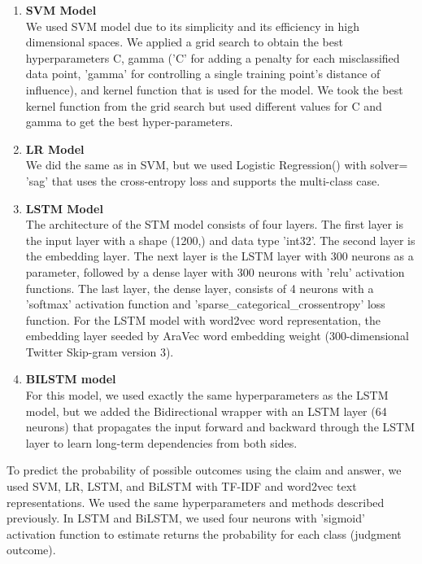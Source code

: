 \documentclass[sn-mathphys,Numbered]{sn-jnl}%
\theoremstyle{thmstyleone}%
\theoremstyle{thmstyletwo}%
\theoremstyle{thmstylethree}%
\begin{document}
      \begin{enumerate}
          \item \textbf{SVM Model}\\
We used SVM model due to its simplicity and its efficiency in high dimensional spaces. We applied a grid search to obtain the best hyperparameters C, gamma ('C' for adding a penalty for each misclassified data point, 'gamma' for controlling a single training point's distance of influence), and kernel function that is used for the model. We took the best kernel function from the grid search but used different values for C and gamma to get the best hyper-parameters. %

          
          
          \item \textbf{LR Model}\label{LR model1}\\
          We did the same as in SVM, but we used Logistic Regression() with solver= 'sag' that uses the cross-entropy loss and supports the multi-class case. 
          
          \item \textbf{LSTM Model}\label{LSTM Model1}\\
          The architecture of the STM model consists of four layers. The first layer is the input layer with a shape (1200,) and data type 'int32'. The second layer is the embedding layer. The next layer is the LSTM layer with 300 neurons as a parameter, followed by a dense layer with 300 neurons with 'relu' activation functions. The last layer, the dense layer, consists of 4 neurons with a 'softmax' activation function and 'sparse\_categorical\_crossentropy' loss function. For the LSTM model with word2vec word representation, the embedding layer seeded by AraVec word embedding weight (300-dimensional Twitter Skip-gram version 3).
    
    \item \textbf{BILSTM model} \\
    For this model, we used exactly the same hyperparameters as the LSTM model, but we added the Bidirectional wrapper with an LSTM layer (64 neurons) that propagates the input forward and backward through the LSTM layer to learn long-term dependencies from both sides.
      \end{enumerate}
    
 
To predict the probability of possible outcomes using the claim and answer, we used SVM, LR, LSTM, and BiLSTM with TF-IDF and word2vec text representations. We used the same hyperparameters and methods described previously. In LSTM and BiLSTM, we used four neurons with 'sigmoid' activation function to estimate returns the probability for each class (judgment outcome).
\end{document}
